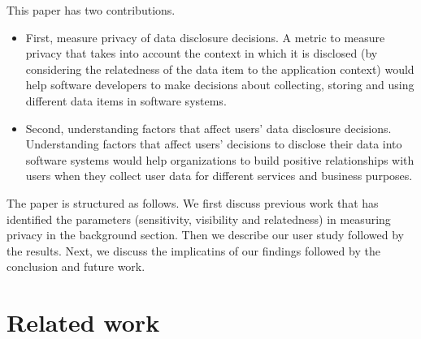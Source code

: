 \documentclass[conference]{IEEEtran}
\begin{document}
This paper has two contributions.

\begin{itemize}
\item  First, measure privacy of data disclosure decisions. A metric to measure privacy that takes into account the context in which it is disclosed (by considering the relatedness of the data item to the application context) would help software developers to make decisions about collecting, storing and using different data items in software systems. 
\item Second, understanding factors that affect users' data disclosure decisions. Understanding factors that affect users' decisions to disclose their data into software systems would help organizations to build positive relationships with users when they collect user data for different services and business purposes. 
\end{itemize}

The paper is structured as follows. We first discuss previous work that has identified the parameters (sensitivity, visibility and relatedness) in measuring privacy in the background section. Then we describe our user study followed by the results. Next, we discuss the implicatins of our findings followed by the conclusion and future work.

\section {Related work}
\end{document}
